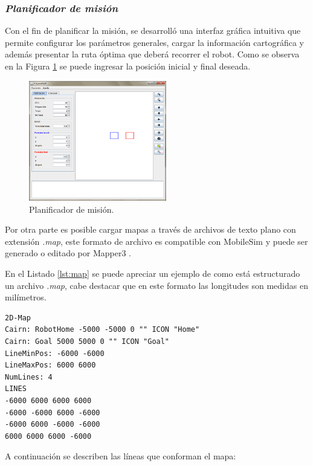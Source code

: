 \documentclass[11pt,twoside,A5]{article}
\newcommand{\reflistings}[1]{Listado \ref{#1}}
\newcommand{\reffigure}[1]{Figura \ref{#1}}
\begin{document}
\subsubsection*{\textit{Planificador de misión}}

Con el fin de planificar la misión, se desarrolló una interfaz gráfica intuitiva que permite configurar
los parámetros generales, cargar la información cartográfica y además presentar la ruta óptima que deberá recorrer el robot. 
Como se observa en la \reffigure{fig:planificador} se puede ingresar la posición inicial y final deseada.

\begin{figure}[here]
\begin{center}
\includegraphics[width=6cm]{ventana-principal.png} 
\caption{Planificador de misión.}
\label{fig:planificador}
\end{center}
\end{figure} 

Por otra parte es posible cargar mapas a través de archivos de texto plano con extensión \textit{.map}, 
este formato de archivo es compatible con MobileSim y puede ser generado o editado por
Mapper3 \cite{mapper2014}.

En el \reflistings{lst:map} se puede apreciar un ejemplo de como está estructurado un archivo \textit{.map},
cabe destacar que en este formato las longitudes son medidas en milímetros.

\begin{minipage}{\linewidth}
\begin{lstlisting}[caption={Ejemplo archivo mapa.}, label=lst:map]
2D-Map
Cairn: RobotHome -5000 -5000 0 "" ICON "Home"
Cairn: Goal 5000 5000 0 "" ICON "Goal" 
LineMinPos: -6000 -6000
LineMaxPos: 6000 6000
NumLines: 4
LINES
-6000 6000 6000 6000
-6000 -6000 6000 -6000
-6000 6000 -6000 -6000
6000 6000 6000 -6000
\end{lstlisting}
\end{minipage}

A continuación se describen las líneas que conforman el mapa:
\end{document}
